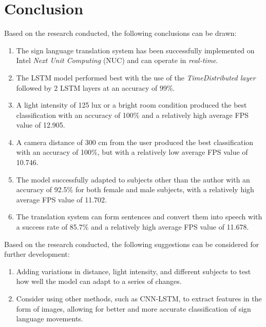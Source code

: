 \section{Conclusion}
\label{sec:conclusion}


Based on the research conducted, the following conclusions can be drawn:

\begin{enumerate}[nolistsep]
  \item The sign language translation system has been successfully implemented on Intel \emph{Next Unit Computing} (NUC) and can operate in \emph{real-time}.
  \item The LSTM model performed best with the use of the \emph{TimeDistributed layer} followed by 2 LSTM layers at an accuracy of 99\%.
  \item A light intensity of 125 lux or a bright room condition produced the best classification with an accuracy of 100\% and a relatively high average FPS value of 12.905.
  \item A camera distance of 300 cm from the user produced the best classification with an accuracy of 100\%, but with a relatively low average FPS value of 10.746.
  \item The model successfully adapted to subjects other than the author with an accuracy of 92.5\% for both female and male subjects, with a relatively high average FPS value of 11.702.
  \item The translation system can form sentences and convert them into speech with a success rate of 85.7\% and a relatively high average FPS value of 11.678.
\end{enumerate}

Based on the research conducted, the following suggestions can be considered for further development:

\begin{enumerate}[nolistsep]
  \item Adding variations in distance, light intensity, and different subjects to test how well the model can adapt to a series of changes.
  \item Consider using other methods, such as CNN-LSTM, to extract features in the form of images, allowing for better and more accurate classification of sign language movements.
\end{enumerate}

